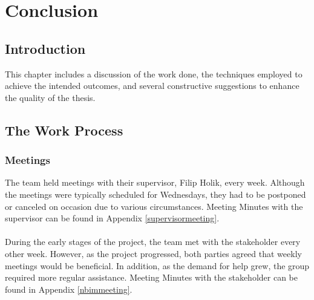 \chapter{Conclusion}
\section{Introduction}
This chapter includes a discussion of the work done, the techniques employed to achieve the intended outcomes, and several constructive suggestions to enhance the quality of the thesis.



\section{The Work Process}

\subsection{Meetings}
The team held meetings with their supervisor, Filip Holik, every week. Although the meetings were typically scheduled for Wednesdays, they had to be postponed or canceled on occasion due to various circumstances. Meeting Minutes with the supervisor can be found in Appendix \ref{supervisormeeting}.
\\~\\
During the early stages of the project, the team met with the stakeholder every other week. However, as the project progressed, both parties agreed that weekly meetings would be beneficial. In addition, as the demand for help grew, the group required more regular assistance. Meeting Minutes with the stakeholder can be found in Appendix \ref{nbimmeeting}.  

